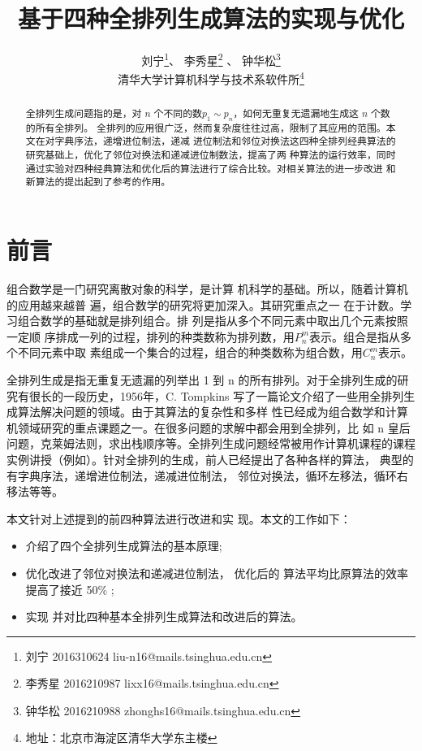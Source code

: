 \documentclass[6pt, twocolumn]{ctexart}
\begin{document}
\title{基于四种全排列生成算法的实现与优化}
\author{刘宁\footnote{刘宁 2016310624 liu-n16@mails.tsinghua.edu.cn}、  李秀星\footnote{李秀星 2016210987 lixx16@mails.tsinghua.edu.cn } 、 
钟华松\footnote{钟华松 2016210988  zhonghs16@mails.tsinghua.edu.cn} \\ 清华大学计算机科学与技术系软件所\footnote{地址：北京市海淀区清华大学东主楼 }}
\date{}
\maketitle
\begin{abstract}全排列生成问题指的是，对 $n$ 个不同的数$p_1 \sim p_n$，如何无重复无遗漏地生成这 $n$ 个数的所有全排列。 全排列的应用很广泛，然而复杂度往往过高，限制了其应用的范围。本文在对字典序法，递增进位制法，递减 进位制法和邻位对换法这四种全排列经典算法的研究基础上，优化了邻位对换法和递减进位制数法，提高了两 种算法的运行效率，同时通过实验对四种经典算法和优化后的算法进行了综合比较。对相关算法的进一步改进 和新算法的提出起到了参考的作用。
	
\end{abstract}
	

\section{ 前言 }
组合数学是一门研究离散对象的科学，是计算 机科学的基础。所以，随着计算机的应用越来越普 遍，组合数学的研究将更加深入。其研究重点之一 在于计数。学习组合数学的基础就是排列组合。排 列是指从多个不同元素中取出几个元素按照一定顺 序排成一列的过程，排列的种类数称为排列数，用$P_{n}^m$表示。组合是指从多个不同元素中取 素组成一个集合的过程，组合的种类数称为组合数，用$C_n^m$表示。



全排列生成是指无重复无遗漏的列举出 1 到 n 的所有排列。对于全排列生成的研究有很长的一段历史，1956年，C. Tompkins 写了一篇论文介绍了一些用全排列生成算法解决问题的领域\cite{Tompkins1956Machine}。由于其算法的复杂性和多样 性已经成为组合数学和计算机领域研究的重点课题之一\cite{chenweidong}。在很多问题的求解中都会用到全排列，比 如 n 皇后问题，克莱姆法则\cite{李模刚2010全排列生成算法在克莱姆法则中的应用}，求出栈顺序等。全排列生成问题经常被用作计算机课程的课程实例讲授（例如\cite{吴素萍2008全排列递归算法在算法教学中的重要性,Dijkstra1979discipline}）。针对全排列的生成，前人已经提出了各种各样的算法， 典型的有字典序法，递增进位制法，递减进位制法， 邻位对换法，循环左移法，循环右移法等等。

本文针对上述提到的前四种算法进行改进和实 现。本文的工作如下：\\
\begin{itemize}
  \item 介绍了四个全排列生成算法的基本原理;
  \item 优化改进了邻位对换法和递减进位制法， 优化后的 算法平均比原算法的效率提高了接近 50\% ;
  \item 实现 并对比四种基本全排列生成算法和改进后的算法。
\end{itemize}
\end{document}

